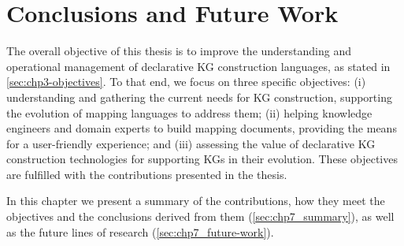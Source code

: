 \chapter{Conclusions and Future Work}
\label{chapter:conclusions}

%

The overall objective of this thesis is to improve the understanding and operational management of declarative KG construction languages, as stated in \cref{sec:chp3-objectives}. To that end, we focus on three specific objectives: (i) understanding and gathering the current needs for KG construction, supporting the evolution of mapping languages to address them; (ii) helping knowledge engineers and domain experts to build mapping documents, providing the means for a user-friendly experience; and (iii) assessing the value of declarative KG construction technologies for supporting KGs in their evolution. These objectives are fulfilled with the contributions presented in the thesis.

In this chapter we present a summary of the contributions, how they meet the objectives and the conclusions derived from them (\cref{sec:chp7_summary}), as well as the future lines of research (\cref{sec:chp7_future-work}). 

